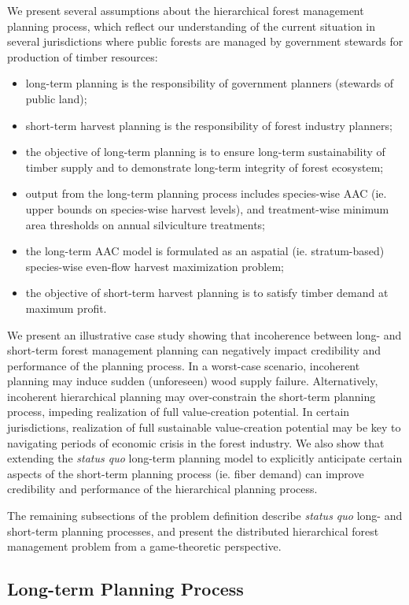 We present several assumptions about the hierarchical forest
management planning process, which reflect our understanding of the
current situation in several jurisdictions where public forests are
managed by government stewards for production of timber resources:
\begin{itemize}
\item long-term planning is the responsibility of government planners (stewards
of public land);
\item short-term harvest planning is the responsibility of forest industry
planners;
\item the objective of long-term planning is to ensure long-term sustainability
of timber supply and to demonstrate long-term integrity of forest
ecosystem;
\item output from the long-term planning process includes species-wise AAC (ie.
upper bounds on species-wise harvest levels), and treatment-wise minimum
area thresholds on annual silviculture treatments;
\item the long-term AAC model is formulated as an aspatial (ie. stratum-based)
species-wise even-flow harvest maximization problem;
\item the objective of short-term harvest planning is to satisfy timber demand
at maximum profit. 
\end{itemize}

We present an illustrative case study showing that
incoherence between long- and short-term forest management planning
can negatively impact credibility and performance of the
planning process. In a worst-case scenario, incoherent planning may
induce sudden (unforeseen) wood supply failure. Alternatively,
incoherent hierarchical planning may over-constrain the short-term
planning process, impeding realization of full value-creation
potential.  In certain jurisdictions, realization of full sustainable
value-creation potential may be key to navigating periods of economic
crisis in the forest industry. We also show that extending the
\emph{status quo} long-term planning model to explicitly anticipate
certain aspects of the short-term planning process (ie. fiber demand)
can improve credibility and performance of the 
hierarchical planning process.

The remaining subsections of the problem definition describe
\emph{status quo} long- and short-term planning processes, and present
the distributed hierarchical forest management problem from a
game-theoretic perspective.

\subsection{Long-term Planning Process}

